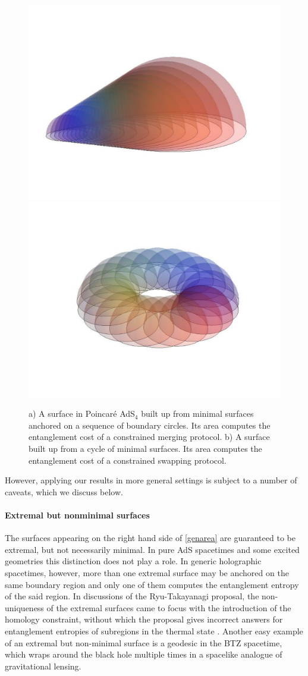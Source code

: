 \documentclass[12pt]{article}
\begin{document}
\begin{figure}[t!]
\centering
{}\includegraphics[width=.45\textwidth]{3dpic.pdf}
\includegraphics[width=.45\textwidth]{3dswap.pdf}
\caption{a) A surface in Poincar{\'e} AdS$_4$ built up from minimal surfaces anchored on a sequence of boundary circles. Its area computes the entanglement cost of a constrained merging protocol. b) A surface built up from a cycle of minimal surfaces. Its area computes the entanglement cost of a constrained swapping protocol.}
\label{lastfig}
\end{figure}

However, applying our results in more general settings is subject to a number of caveats, which we discuss below.

\paragraph{Extremal but nonminimal surfaces}
The surfaces appearing on the right hand side of \eqref{genarea} are guaranteed to be extremal, but not necessarily minimal. In pure AdS spacetimes and some excited geometries \cite{Nogueira:2013if, Gentle:2013fma} this distinction does not play a role. In generic holographic spacetimes, however, more than one extremal surface may be anchored on the same boundary region \cite{renyis, Hubeny:2012ry, plateaux} and only one of them computes the entanglement entropy of the said region. In discussions of the Ryu-Takayanagi proposal, the non-uniqueness of the extremal surfaces came to focus with the introduction of the homology constraint, without which the proposal gives incorrect answers for entanglement entropies of subregions in the thermal state \cite{renyis}. Another easy example of an extremal but non-minimal surface is a geodesic in the BTZ spacetime, which wraps around the black hole multiple times in a spacelike analogue of gravitational lensing.
\end{document}
